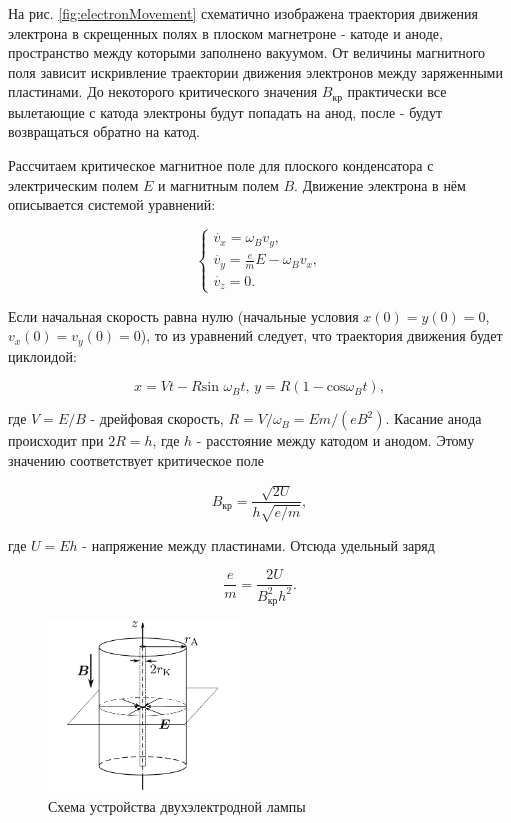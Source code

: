 \documentclass[a4paper,12pt]{article} %
\begin{document}
На рис. \ref{fig:electronMovement} схематично изображена траектория движения электрона в скрещенных полях в плоском магнетроне - катоде и аноде, пространство между которыми заполнено вакуумом. От величины магнитного поля зависит искривление траектории движения электронов между заряженными пластинами. До некоторого критического значения $B_\text{кр}$ практически все вылетающие с катода электроны будут попадать на анод, после - будут возвращаться обратно на катод.

Рассчитаем критическое магнитное поле для плоского конденсатора с электрическим полем $E$ и магнитным полем $B$. Движение электрона в нём описывается системой уравнений:

\begin{equation*}
    \begin{cases}
    \dot{v_x} = \omega_B v_y, \\
    \dot{v_y} = \frac{e}{m}E - \omega_B v_x, \\
    \dot{v_z} = 0.
    \end{cases}
\end{equation*}

Если начальная скорость равна нулю (начальные условия $x(0) = y(0) = 0$, $v_x(0) = v_y(0) = 0$), то из уравнений следует, что траектория движения будет циклоидой:

\begin{equation}
    x = Vt - R\text{sin }\omega_B t \text{,     } y = R(1 - \text{cos}\omega_B t),
\end{equation}

где $V = E/B$ - дрейфовая скорость, $R = V/\omega_B = Em/(eB^2)$. Касание анода происходит при $2R = h$, где $h$ - расстояние между катодом и анодом. Этому значению соответствует критическое поле

\begin{equation}
    B_\text{кр} = \frac{\sqrt{2U}}{h\sqrt{e/m}},
\end{equation}

где $U = Eh$ - напряжение между пластинами. Отсюда удельный заряд

\begin{equation}
    \frac{e}{m} = \frac{2U}{B_\text{кр}^2 h^2}.
\end{equation}

\begin{figure}
    \centering
    \includegraphics[width = 0.45\textwidth]{sphericMagnetron.png}
    \caption{Схема устройства двухэлектродной лампы}
    \label{fig:sphericMagnetron}
\end{figure}
\end{document}

